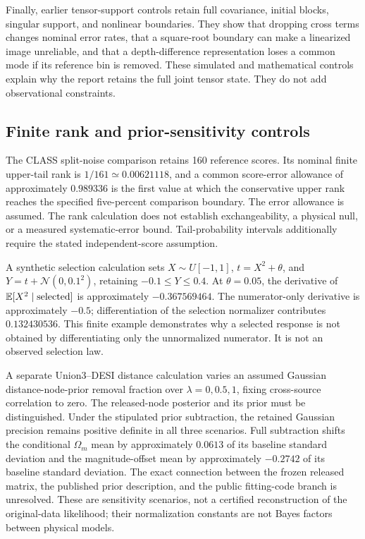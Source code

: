 Finally, earlier tensor-support controls retain full covariance, initial blocks, singular support, and nonlinear boundaries. They show that dropping cross terms changes nominal error rates, that a square-root boundary can make a linearized image unreliable, and that a depth-difference representation loses a common mode if its reference bin is removed. These simulated and mathematical controls explain why the report retains the full joint tensor state. They do not add observational constraints.

\subsection{Finite rank and prior-sensitivity controls}

The CLASS split-noise comparison retains 160 reference scores. Its nominal finite upper-tail rank is $1/161\simeq0.00621118$, and a common score-error allowance of approximately $0.989336$ is the first value at which the conservative upper rank reaches the specified five-percent comparison boundary. The error allowance is assumed. The rank calculation does not establish exchangeability, a physical null, or a measured systematic-error bound. Tail-probability intervals additionally require the stated independent-score assumption.

A synthetic selection calculation sets $X\sim U[-1,1]$, $t=X^2+\theta$, and $Y=t+\mathcal N(0,0.1^2)$, retaining $-0.1\leq Y\leq0.4$. At $\theta=0.05$, the derivative of $\mathbb E[X^2\mid\mathrm{selected}]$ is approximately $-0.367569464$. The numerator-only derivative is approximately $-0.5$; differentiation of the selection normalizer contributes $0.132430536$. This finite example demonstrates why a selected response is not obtained by differentiating only the unnormalized numerator. It is not an observed selection law.

A separate Union3--DESI distance calculation varies an assumed Gaussian distance-node-prior removal fraction over $\lambda=0,0.5,1$, fixing cross-source correlation to zero. The released-node posterior and its prior must be distinguished.\cite{Kim2024} Under the stipulated prior subtraction, the retained Gaussian precision remains positive definite in all three scenarios. Full subtraction shifts the conditional $\Omega_m$ mean by approximately $0.0613$ of its baseline standard deviation and the magnitude-offset mean by approximately $-0.2742$ of its baseline standard deviation. The exact connection between the frozen released matrix, the published prior description, and the public fitting-code branch is unresolved. These are sensitivity scenarios, not a certified reconstruction of the original-data likelihood; their normalization constants are not Bayes factors between physical models.

